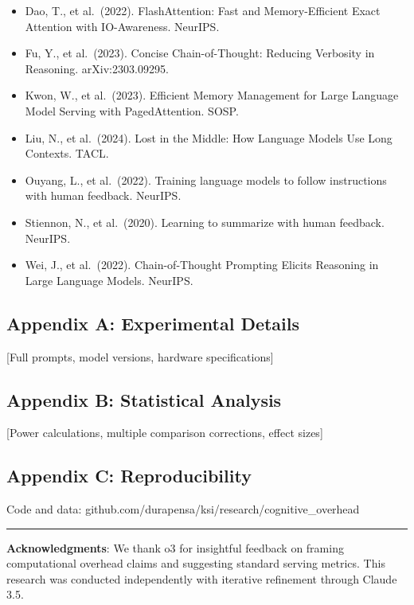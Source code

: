 \documentclass[
  11pt]{article}
\providecommand{\tightlist}{%
  \setlength{\itemsep}{0pt}\setlength{\parskip}{0pt}}
\begin{document}
\begin{itemize}
\tightlist
\item
  Dao, T., et al.~(2022). FlashAttention: Fast and Memory-Efficient
  Exact Attention with IO-Awareness. NeurIPS.
\item
  Fu, Y., et al.~(2023). Concise Chain-of-Thought: Reducing Verbosity in
  Reasoning. arXiv:2303.09295.
\item
  Kwon, W., et al.~(2023). Efficient Memory Management for Large
  Language Model Serving with PagedAttention. SOSP.
\item
  Liu, N., et al.~(2024). Lost in the Middle: How Language Models Use
  Long Contexts. TACL.
\item
  Ouyang, L., et al.~(2022). Training language models to follow
  instructions with human feedback. NeurIPS.
\item
  Stiennon, N., et al.~(2020). Learning to summarize with human
  feedback. NeurIPS.
\item
  Wei, J., et al.~(2022). Chain-of-Thought Prompting Elicits Reasoning
  in Large Language Models. NeurIPS.
\end{itemize}

\subsection{Appendix A: Experimental
Details}\label{appendix-a-experimental-details}

{[}Full prompts, model versions, hardware specifications{]}

\subsection{Appendix B: Statistical
Analysis}\label{appendix-b-statistical-analysis}

{[}Power calculations, multiple comparison corrections, effect sizes{]}

\subsection{Appendix C:
Reproducibility}\label{appendix-c-reproducibility}

Code and data: github.com/durapensa/ksi/research/cognitive\_overhead

\begin{center}\rule{0.5\linewidth}{0.5pt}\end{center}

\textbf{Acknowledgments}: We thank o3 for insightful feedback on framing
computational overhead claims and suggesting standard serving metrics.
This research was conducted independently with iterative refinement
through Claude 3.5.
\end{document}
